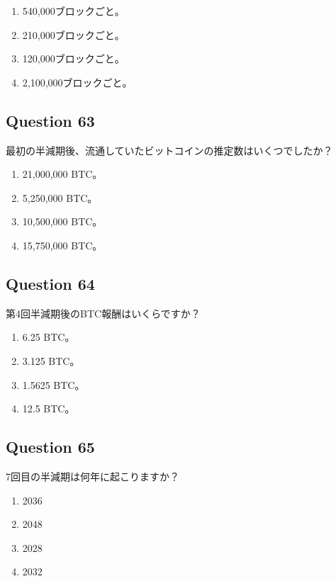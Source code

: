 \documentclass[12pt,a4paper]{article}
\begin{document}
\begin{enumerate}[label=\Alph*., leftmargin=*]
\item 540,000ブロックごと。
\item 210,000ブロックごと。
\item 120,000ブロックごと。
\item 2,100,000ブロックごと。
\end{enumerate}

\bigskip


\subsection*{Question 63}
最初の半減期後、流通していたビットコインの推定数はいくつでしたか？

\begin{enumerate}[label=\Alph*., leftmargin=*]
\item 21,000,000 BTC。
\item 5,250,000 BTC。
\item 10,500,000 BTC。
\item 15,750,000 BTC。
\end{enumerate}

\bigskip


\subsection*{Question 64}
第4回半減期後のBTC報酬はいくらですか？

\begin{enumerate}[label=\Alph*., leftmargin=*]
\item 6.25 BTC。
\item 3.125 BTC。
\item 1.5625 BTC。
\item 12.5 BTC。
\end{enumerate}

\bigskip


\subsection*{Question 65}
7回目の半減期は何年に起こりますか？

\begin{enumerate}[label=\Alph*., leftmargin=*]
\item 2036
\item 2048
\item 2028
\item 2032
\end{enumerate}
\end{document}
